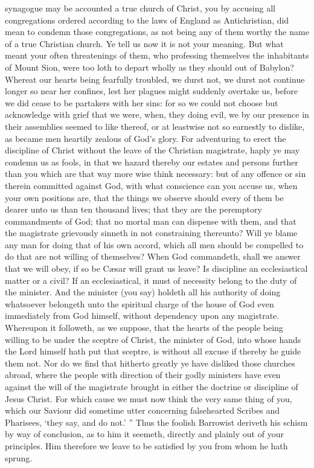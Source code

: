 synagogue may be accounted a true church of Christ, you by accusing all congregations ordered according to the laws of England as Antichristian, did mean to condemn those congregations, as not being any of them worthy the name of a true Christian church. Ye tell us now it is not your meaning. But what meant your often threatenings of them, who professing themselves the inhabitants of Mount Sion, were too loth to depart wholly as they should out of Babylon? Whereat our hearts being fearfully troubled, we durst not, we durst not continue longer so near her confines, lest her plagues might suddenly overtake us, before we did cease to be partakers with her sins: for so we could not choose but acknowledge with grief that we were, when, they doing evil, we by our presence in their assemblies seemed to like thereof, or at leastwise not so earnestly to dislike, as became men heartily zealous of God’s glory. For adventuring to erect the discipline of Christ without the leave of the Christian magistrate, haply ye may condemn us as fools, in that we hazard thereby our estates and persons further than you which are that way more wise think necessary: but of any offence or sin therein committed against God, with what conscience can you accuse us, when your own positions are, that the things we observe should every of them be dearer unto us than ten thousand lives; that they are the peremptory commandments of God; that no mortal man can dispense with them, and that the magistrate grievously sinneth in not constraining thereunto? Will ye blame any man for doing that of his own accord, which all men should be compelled to do that are not willing of themselves? When God commandeth, shall we answer that we will obey, if so be Cæsar will grant us leave? Is discipline an ecclesiastical matter or a civil? If an ecclesiastical, it must of necessity belong to the duty of the minister. And the minister (you say) holdeth all his authority of doing whatsoever belongeth unto the spiritual charge of the house of God even immediately from God himself, without dependency upon any magistrate. Whereupon it followeth, as we suppose, that the hearts of the people being willing to be under the sceptre of Christ, the minister of God, into whose hands the Lord himself hath put that sceptre, is without all excuse if thereby he guide them not. Nor do we find that hitherto greatly ye have disliked those churches abroad, where the people with direction of their godly ministers have even against the will of the magistrate brought in either the doctrine or discipline of Jesus Christ. For which cause we must now think the very same thing of you, which our Saviour did sometime utter concerning falsehearted Scribes and Pharisees, ‘they say, and do not.’ ” Thus the foolish Barrowist deriveth his schism by way of conclusion, as to him it seemeth, directly and plainly out of your principles. Him therefore we leave to be satisfied by you from whom he hath sprung.

